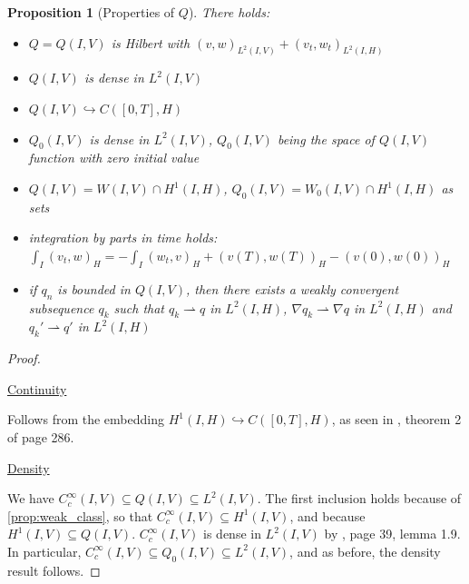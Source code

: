 \documentclass[english,a4paper,9pt,oneside]{scrbook}	%
\theoremstyle{break}
\newtheorem{prop}[equation]{Proposition}
\newenvironment{mproof}[1][\proofname]{%
  \begin{proof}[#1]$ $\par\nobreak\ignorespaces
}{%
  \end{proof}
}
\renewcommand*{\proofname}{Proof}
\theoremstyle{remark}
\newcommand{\ds}{\displaystyle}
\newcommand{\emb}{\hookrightarrow}
\newcommand{\weakc}{\rightharpoonup}
\begin{document}
\begin{appendices}
\begin{prop}[Properties of $Q$]
\label{prop:Q}
There holds:
\begin{itemize}
	\item $Q=Q(I,V)$ is Hilbert with $(v,w)_{L^2(I,V)} + (v_t,w_t)_{L^2(I,H)}$ 
	\item $Q(I,V)$ is dense in $L^2(I,V)$
	\item $Q(I,V)\emb C([0,T],H)$
	\item $Q_0(I,V)$ is dense in $L^2(I,V)$, $Q_0(I,V)$ being the space of $Q(I,V)$ function with zero initial value
	\item $Q(I,V) = W(I,V)\cap H^1(I,H)$, $Q_0(I,V) =  W_0(I,V)\cap H^1(I,H)$ as sets
	\item integration by parts in time holds: $\ds \int_I(v_t,w)_H = -\int_I(w_t,v)_H +(v(T),w(T))_H-(v(0),w(0))_H$
	\item if $q_n$ is bounded in $Q(I,V)$, then there exists a weakly convergent subsequence $q_k$ such that $q_k\weakc q$ in $L^2(I,H)$, $\nabla q_k\weakc \nabla q$ in $L^2(I,H)$ and $q_k'\weakc q'$ in $L^2(I,H)$
\end{itemize}
\end{prop}
\begin{mproof}

%
%
%

\underline{Continuity}

Follows from the embedding $H^1(I,H)\emb C([0,T],H)$, as seen in \cite{evans}, theorem 2 of page 286.

\underline{Density}

We have $C_c^\infty(I,V) \subseteq Q(I,V) \subseteq L^2(I,V)$. The first inclusion holds because of \cref{prop:weak_class}, so that $C_c^\infty(I,V)\subseteq H^1(I,V)$, and because $H^1(I,V)\subseteq  Q(I,V) $. $C_c^\infty(I,V)$ is dense in $ L^2(I,V)$ by \cite{hinze}, page 39, lemma 1.9. In particular,  $C_c^\infty(I,V) \subseteq Q_0(I,V)\subseteq L^2(I,V)$, and as before, the density result follows.


\end{mproof}
\end{appendices}
\end{document}
